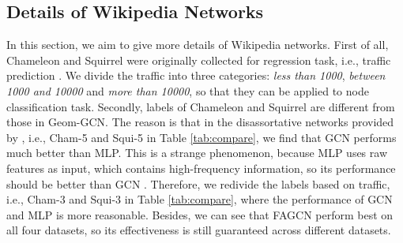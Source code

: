 \documentclass[letterpaper]{article} %
\newcommand\myworries[1]{\textcolor{red}{#1}}
\begin{document}


\subsection{Details of Wikipedia Networks}

In this section, we aim to give more details of Wikipedia networks. First of all, Chameleon and Squirrel were originally collected for regression task, i.e., traffic prediction \cite{wikinet}. We divide the traffic into three categories: \emph{less than 1000}, \emph{between 1000 and 10000} and \emph{more than 10000}, so that they can be applied to node classification task. Secondly, labels of Chameleon and Squirrel are different from those in Geom-GCN. The reason is that in the disassortative networks provided by \cite{GeomGCN}, i.e., Cham-5 and Squi-5 in Table \ref{tab:compare}, we find that GCN performs much better than MLP. This is a strange phenomenon, because MLP uses raw features as input, which contains high-frequency information, so its performance should be better than GCN \cite{H2GNN}. Therefore, we redivide the labels based on traffic, i.e., Cham-3 and Squi-3 in Table \ref{tab:compare}, where the performance of GCN and MLP is more reasonable. Besides, we can see that FAGCN perform best on all four datasets, so its effectiveness is still guaranteed across different datasets.

\end{document}
